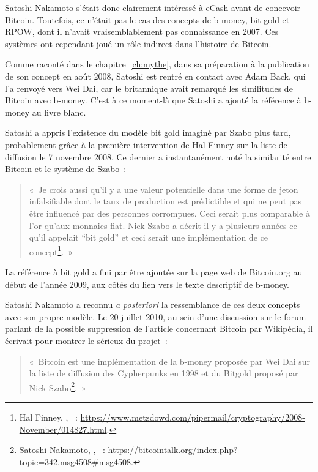 Satoshi Nakamoto s'était donc clairement intéressé à eCash avant de concevoir Bitcoin. Toutefois, ce n'était pas le cas des concepts de b-money, bit gold et RPOW, dont il n'avait vraisemblablement pas connaissance en 2007. Ces systèmes ont cependant joué un rôle indirect dans l'histoire de Bitcoin.

Comme raconté dans le chapitre~\ref{ch:mythe}, dans sa préparation à la publication de son concept en août 2008, Satoshi est rentré en contact avec Adam Back, qui l'a renvoyé vers Wei Dai, car le britannique avait remarqué les similitudes de Bitcoin avec b-money. C'est à ce moment-là que Satoshi a ajouté la référence à b-money au livre blanc.

Satoshi a appris l'existence du modèle bit gold imaginé par Szabo plus tard, probablement grâce à la première intervention de Hal Finney sur la liste de diffusion le 7 novembre 2008. Ce dernier a instantanément noté la similarité entre Bitcoin et le système de Szabo~:

\begin{quote}
«~Je crois aussi qu'il y a une valeur potentielle dans une forme de jeton infalsifiable dont le taux de production est prédictible et qui ne peut pas être influencé par des personnes corrompues. Ceci serait plus comparable à l'or qu'aux monnaies fiat. Nick Szabo a décrit il y a plusieurs années ce qu'il appelait “bit gold” et ceci serait une implémentation de ce concept\footnote{Hal Finney, , ~: \url{https://www.metzdowd.com/pipermail/cryptography/2008-November/014827.html}.}.~»
\end{quote}

La référence à bit gold a fini par être ajoutée sur la page web de Bitcoin.org au début de l'année 2009, aux côtés du lien vers le texte descriptif de b-money.

Satoshi Nakamoto a reconnu \emph{a posteriori} la ressemblance de ces deux concepts avec son propre modèle. Le 20 juillet 2010, au sein d'une discussion sur le forum parlant de la possible suppression de l'article concernant Bitcoin par Wikipédia, il écrivait pour montrer le sérieux du projet~:

\begin{quote}
«~Bitcoin est une implémentation de la b-money proposée par Wei Dai sur la liste de diffusion des Cypherpunks en 1998 et du Bitgold proposé par Nick Szabo\footnote{Satoshi Nakamoto, , ~: \url{https://bitcointalk.org/index.php?topic=342.msg4508\#msg4508}.}.~»
\end{quote}

